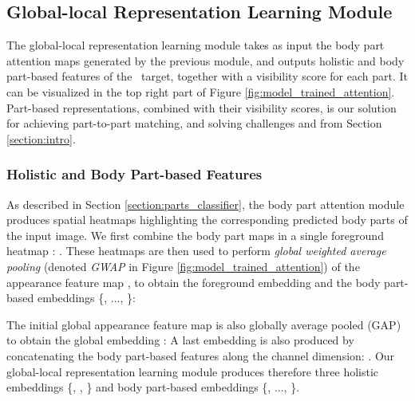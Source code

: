 \documentclass[10pt,twocolumn,letterpaper]{article}
\begin{document}
\subsection{Global-local Representation Learning Module} \label{section:rep_learning}







The global-local representation learning module takes as input the body part attention maps generated by the previous module, and outputs holistic and body part-based features of the \reid\ target, together with a visibility score for each part.
It can be visualized in the top right part of Figure \ref{fig:model_trained_attention}.
Part-based representations, combined with their visibility scores, is our solution for achieving part-to-part matching, and solving challenges  and  from Section \ref{section:intro}.


\subsubsection{Holistic and Body Part-based Features} \label{section:features}
As described in Section \ref{section:parts_classifier}, the body part attention module produces  spatial heatmaps highlighting the corresponding  predicted body parts of the input image. 
We first combine the  body part maps  in a single foreground heatmap : . 
These heatmaps are then used to perform  \textit{global weighted average pooling} (denoted \textit{GWAP} in Figure \ref{fig:model_trained_attention}) of the appearance feature map , to obtain the foreground embedding  and the  body part-based embeddings \{, ..., \}:
{\small{

}}


The initial global appearance feature map  is also globally average pooled (GAP) to obtain the global embedding :  
A last embedding  is also produced by concatenating the  body part-based features along the channel dimension: .
Our global-local representation learning module produces therefore three holistic embeddings \{, , \} and  body part-based embeddings \{, ..., \}.
\end{document}
